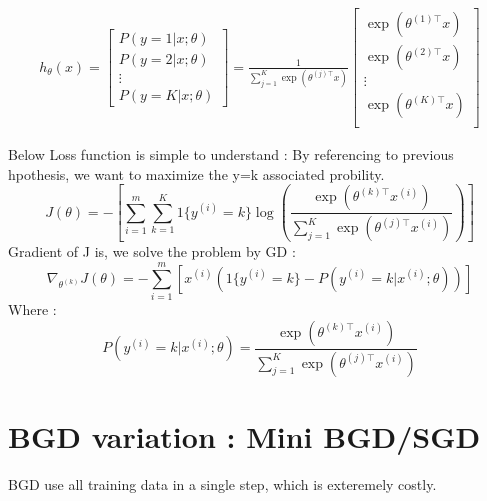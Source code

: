 \documentclass{article}
\begin{document}
\begin{align}
h_\theta(x) =
\begin{bmatrix}
P(y = 1 | x; \theta) \\
P(y = 2 | x; \theta) \\
\vdots \\
P(y = K | x; \theta)
\end{bmatrix}
=
\frac{1}{ \sum_{j=1}^{K}{\exp(\theta^{(j)\top} x) }}
\begin{bmatrix}
\exp(\theta^{(1)\top} x ) \\
\exp(\theta^{(2)\top} x ) \\
\vdots \\
\exp(\theta^{(K)\top} x ) \\
\end{bmatrix}
\end{align}

Below Loss function  is simple to understand : By referencing to previous hpothesis, we want to maximize the y=k associated probility. 
\[J(\theta) = -\left[ \sum_{i=1}^m \sum_{k=1}^K 1\{y^{(i)}=k\} \log \left( \frac{\exp(\theta^{(k)\top} x^{(i)})}{\sum_{j=1}^K \exp(\theta^{(j)\top} x^{(i)})} \right) \right]\]
Gradient of J is, we solve the problem by  GD : 
\[\nabla_{\theta^{(k)}} J(\theta) = -\sum_{i=1}^m \left[ x^{(i)} \left( 1\{y^{(i)}=k\} - P(y^{(i)}=k|x^{(i)};\theta) \right) \right]\]
Where : 
\[P(y^{(i)}=k|x^{(i)};\theta) = \frac{\exp(\theta^{(k)\top} x^{(i)})}{\sum_{j=1}^K \exp(\theta^{(j)\top} x^{(i)})}\]


\section{BGD variation : Mini BGD/SGD}
BGD use all training data in a single step, which is exteremely costly.
\end{document}
